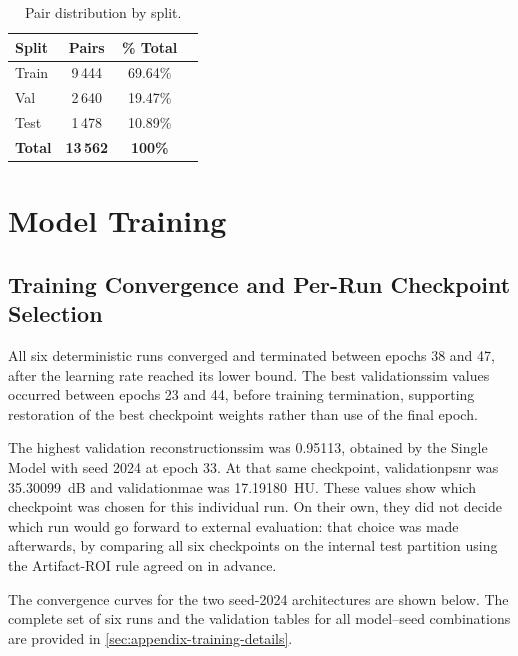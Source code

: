 \begin{table}[H]
    \centering
    \begin{tabular}{lccc}
        \hline
        \textbf{Split} & \textbf{Pairs} & \textbf{\% Total}\\
        \hline
        Train  & 9\,444 & 69.64\%\\
        Val    & 2\,640 & 19.47\%\\
        Test   & 1\,478 & 10.89\%\\
        \hline
        \textbf{Total} & \textbf{13\,562} & \textbf{100\%} \\
        \hline
    \end{tabular}
    \captionsetup{skip=2pt}
    \caption[Pair distribution by split]{Pair distribution by split.}
    \label{tab:final-split-pairs-subset}
\end{table}

\section{Model Training}
\subsection{Training Convergence and Per-Run Checkpoint Selection}

All six deterministic runs converged and terminated between epochs 38 and 47, after the learning rate reached its lower bound. The best validation\acrshort{ssim} values occurred between epochs 23 and 44, before training termination, supporting restoration of the best checkpoint weights rather than use of the final epoch.

The highest validation reconstruction\acrshort{ssim} was 0.95113, obtained by the Single Model with seed 2024 at epoch 33. At that same checkpoint, validation\acrshort{psnr} was 35.30099~dB and validation\acrshort{mae} was 17.19180~HU. These values show which checkpoint was chosen for this individual run. On their own, they did not decide which run would go forward to external evaluation: that choice was made afterwards, by comparing all six checkpoints on the internal test partition using the Artifact-ROI rule agreed on in advance.

The convergence curves for the two seed-2024 architectures are shown below. The complete set of six runs and the validation tables for all model--seed combinations are provided in \autoref{sec:appendix-training-details}.




